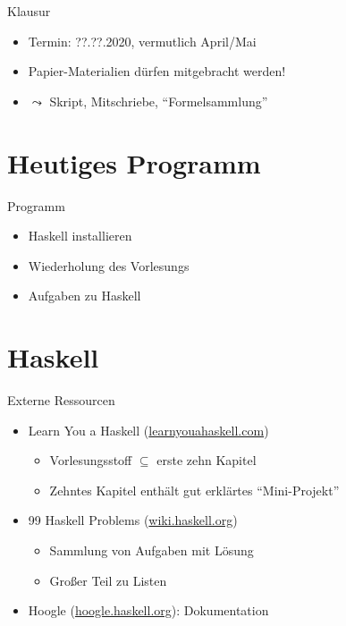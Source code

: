 \documentclass{beamer}
\begin{document}
\begin{frame}{Klausur}
	\begin{itemize}
		\item Termin: ??.??.2020, vermutlich April/Mai
		\item Papier-Materialien dürfen mitgebracht werden!
		\item $\leadsto$ Skript, Mitschriebe, \enquote{Formelsammlung}
	\end{itemize}
\end{frame}

\section{Heutiges Programm}
\begin{frame}{Programm}
	\begin{itemize}
		\item Haskell installieren
		\item Wiederholung des Vorlesungs
		\item Aufgaben zu Haskell
	\end{itemize}
\end{frame}


\section{Haskell}

\begin{frame}{Externe Ressourcen}
  \begin{itemize}
    \item Learn You a Haskell (\href{http://learnyouahaskell.com}{learnyouahaskell.com})
    \begin{itemize}
      \item Vorlesungsstoff $\subseteq$ erste zehn Kapitel
      \item Zehntes Kapitel enthält gut erklärtes \enquote{Mini-Projekt}
    \end{itemize}
    \item 99 Haskell Problems (\href{https://wiki.haskell.org/H-99:_Ninety-Nine_Haskell_Problems}{wiki.haskell.org})
    \begin{itemize}
      \item Sammlung von Aufgaben mit Lösung
      \item Großer Teil zu Listen
    \end{itemize}
    \item Hoogle (\href{https://hoogle.haskell.org}{hoogle.haskell.org}): Dokumentation
  \end{itemize}
\end{frame}
\end{document}
